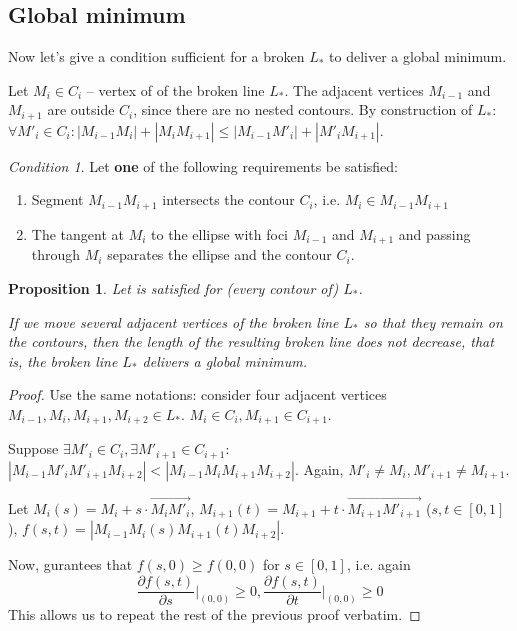 \documentclass[]{interact}
\theoremstyle{plain}%
\newtheorem{proposition}[theorem]{Proposition}
\theoremstyle{definition}
\theoremstyle{remark}
\newtheorem{condition}{Condition}
\begin{document}
\subsection{Global minimum}

Now let's give a condition sufficient
for a broken
$L_*$
to deliver a global minimum.

Let
$M_i \in C_i$ --
vertex of of the broken line
$L_*$.
The adjacent vertices
$M_{i-1}$
and
$M_{i+1}$
are outside
$C_i$,
since there are no nested contours.
By construction of
$L_*$:
$\forall M'_i \in C_i:
|M_{i-1} M_i|+|M_i M_{i+1}|
\le
|M_{i-1} M'_i|+|M'_i M_{i+1}|
$.

\begin{condition}
Let \textbf{one} of the following requirements be satisfied:
\begin{enumerate}
  \item
  Segment $M_{i-1} M_{i+1}$ intersects the contour
  $C_i$,
  i.e.
  $M_i \in M_{i-1} M_{i+1}$
  \item
  The tangent at
  $M_i$
  to the ellipse with foci
  $M_{i-1}$
  and
  $M_{i+1}$
  and passing through
  $M_i$
  separates the ellipse and the contour
  $C_i$.
\end{enumerate}
\end{condition}

\begin{proposition}
  Let 
  is satisfied for
  (every contour of)
  $L_*$.

  If we move several adjacent vertices of the broken line
  $L_*$ so that they remain on the contours,
  then the length of the resulting broken line does not decrease,
  that is, the broken line
  $L_*$ delivers a global minimum.
\end{proposition}

\begin{proof}
Use the same notations:
consider four adjacent vertices
$M_{i-1}, M_i, M_{i+1}, M_{i+2} \in L_*$.
$M_i \in  C_i,
M_{i+1} \in C_{i+1}$.

Suppose
$
\exists M'_i \in C_i,
\exists M'_{i+1} \in C_{i+1}
$:
$
|M_{i-1} M'_i M'_{i+1} M_{i+2}|
<
|M_{i-1} M_i M_{i+1} M_{i+2}|
$.
Again,
$
M'_i \ne M_i,
M'_{i+1} \ne M_{i+1}
$.

Let
$
M_i(s)=M_i+s \cdot \overrightarrow{M_i M'_i}
$,
$
 M_{i+1}(t)= M_{i+1}+t \cdot \overrightarrow{M_{i+1} M'_{i+1}}
$
($s,t \in[0,1]$),
$f(s,t)=
|M_{i-1} M_i(s) M_{i+1}(t) M_{i+2}|
$.

Now,
gurantees that
$f(s,0)\ge f(0,0)$
for
$s\in[0,1]$,
i.e. again
\begin{equation}
  \frac{\partial f(s,t)}{\partial s} \Big|_{(0,0)} \ge 0,
  \frac{\partial f(s,t)}{\partial t} \Big|_{(0,0)} \ge 0
\end{equation}
This allows us to repeat the rest of the previous proof verbatim.
\end{proof}
\end{document}
